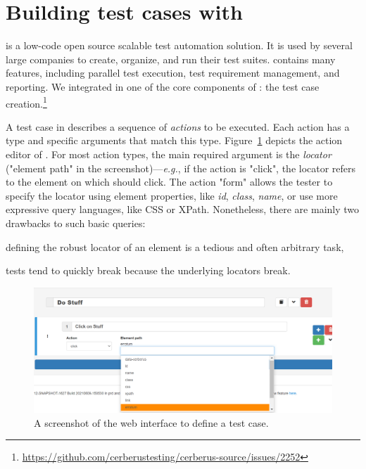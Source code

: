 
\section{Building test cases with \cerberus}\label{cerberus:sec:cerberus}
\cerberus is a low-code open source scalable test automation solution.
It is used by several large companies to create, organize, and run their test suites.
\cerberus contains many features, including parallel test execution, test requirement management, and reporting.
We integrated \erratum in one of the core components of \cerberus: the test case creation.\footnote{\url{https://github.com/cerberustesting/cerberus-source/issues/2252}}

A test case in \cerberus describes a sequence of \textit{actions} to be executed.
Each action has a type and specific arguments that match this type.
Figure~\ref{cerberus:fig:cerberus} depicts the action editor of \cerberus.
For most action types, the main required argument is the \textit{locator} ("element path" in the screenshot)---\emph{e.g.}, if the action is "click", the locator refers to the element on which \cerberus should click.
The action "form" allows the tester to specify the locator using element properties, like \textit{id}, \textit{class}, \textit{name}, or use more expressive query languages, like CSS or XPath.
Nonetheless, there are mainly two drawbacks to such basic queries:
\begin{compactitem}
    \item defining the robust locator of an element is a tedious and often arbitrary task,
    \item tests tend to quickly break because the underlying locators break.
\end{compactitem}

\begin{figure}[]
    \centering
    \includegraphics[width=.85\linewidth]{cerberus/explanations/cerberus}
    \caption{A screenshot of the \cerberus web interface to define a test case.}
    \label{cerberus:fig:cerberus}
\end{figure}

